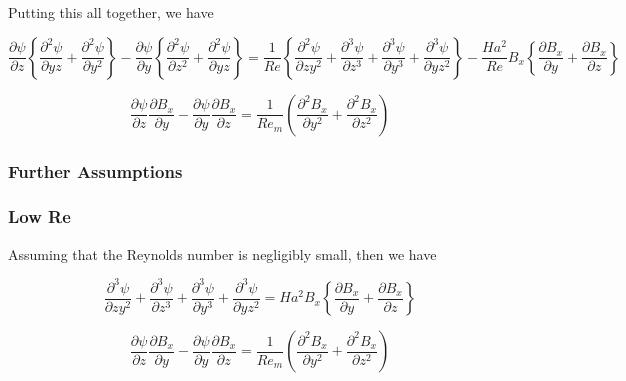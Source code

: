 \documentclass[11pt]{article}
\begin{document}
Putting this all together, we have

\begin{equation}
	\frac{\partial \psi }{\partial z}
	\left\{
	\frac{\partial^2 \psi}{\partial yz}
	+
	\frac{\partial^2 \psi}{\partial y^2}
	\right\}
	-
	\frac{\partial \psi}{\partial y}
	\left\{
	\frac{\partial^2 \psi}{\partial z^2}
	+
	\frac{\partial^2 \psi}{\partial yz}
	\right\}
	=
	\frac{1}{Re}
	\left\{
	\frac{\partial^2 \psi}{\partial z y^2}
	+
	\frac{\partial^3 \psi}{\partial z^3}
	+
	\frac{\partial^3 \psi}{\partial y^3}
	+\frac{\partial^3 \psi}{\partial y z^2}
	\right\}
	-
	\frac{Ha^2}{Re}
	B_x
	\left\{
	\frac{\partial B_x}{\partial y}
	+
	\frac{\partial B_x}{\partial z}
	\right\}
\end{equation}

\begin{equation}
	\frac{\partial \psi}{\partial z}
	\frac{\partial B_x}{\partial y}
	-
	\frac{\partial \psi}{\partial y}
	\frac{\partial B_x}{\partial z}
	=
	\frac{1}{Re_m}
	\left(
	\frac{\partial^2 B_x}{\partial y^2}
	+ \frac{\partial^2 B_x}{\partial z^2}
	\right)
\end{equation}


\subsubsection{Further Assumptions}

\subsubsection{Low Re}
Assuming that the Reynolds number is negligibly small, then we have


\begin{equation}
	\frac{\partial^3 \psi}{\partial z y^2}
	+
	\frac{\partial^3 \psi}{\partial z^3}
	+
	\frac{\partial^3 \psi}{\partial y^3}
	+\frac{\partial^3 \psi}{\partial y z^2}
	=
	Ha^2
	B_x
	\left\{
	\frac{\partial B_x}{\partial y}
	+
	\frac{\partial B_x}{\partial z}
	\right\}
\end{equation}

\begin{equation}
	\frac{\partial \psi}{\partial z}
	\frac{\partial B_x}{\partial y}
	-
	\frac{\partial \psi}{\partial y}
	\frac{\partial B_x}{\partial z}
	=
	\frac{1}{Re_m}
	\left(
	\frac{\partial^2 B_x}{\partial y^2}
	+ \frac{\partial^2 B_x}{\partial z^2}
	\right)
\end{equation}
\end{document}
